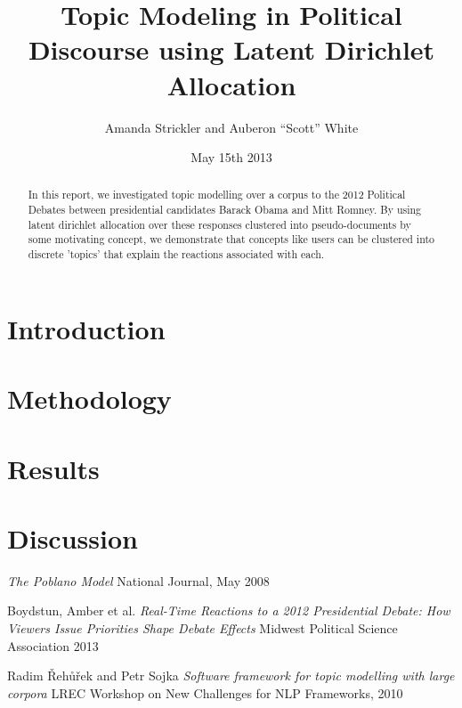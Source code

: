 \documentclass[12pt]{report}
\begin{document}
\title{Topic Modeling in Political Discourse using Latent Dirichlet Allocation}
\author{Amanda Strickler and Auberon ``Scott'' White}
\date{May 15th 2013}
\maketitle

\begin{abstract}
In this report, we investigated topic modelling over a corpus to the 2012 Political Debates between presidential candidates Barack Obama and Mitt Romney. By using latent dirichlet allocation over these responses clustered into pseudo-documents by some motivating concept, we demonstrate that concepts like users can be clustered into discrete 'topics' that explain the reactions associated with each.
\end{abstract}

\section{Introduction}
\label{sec:1}


\section{Methodology}
\label{sec:2}


\section{Results}
\label{sec:3}


\section{Discussion}
\label{sec:4}



\begin{thebibliography}{99}
  \emph{The Poblano Model}
  National Journal, May 2008

  Boydstun, Amber et al.
  \emph{Real-Time Reactions to a 2012 Presidential Debate: How Viewers Issue Priorities Shape Debate Effects}
  Midwest Political Science Association 2013

  Radim Řehůřek and Petr Sojka 
  \emph{Software framework for topic modelling with large corpora}
  LREC Workshop on New Challenges for NLP Frameworks, 2010
\end{thebibliography}
\end{document}
